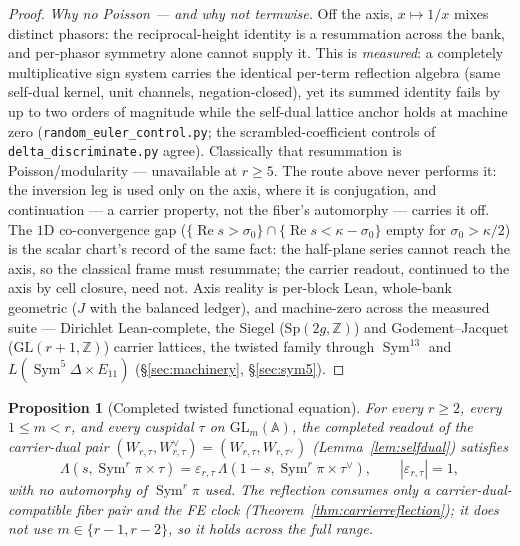 \documentclass[11pt]{article}
\newtheorem{proposition}[theorem]{Proposition}
\theoremstyle{definition}
\renewcommand{\Re}{\operatorname{Re}}
\newcommand{\Sym}{\operatorname{Sym}}
\begin{document}
\begin{proof}
\emph{Why no Poisson --- and why not termwise.} Off the axis, $x\mapsto1/x$ mixes distinct phasors: the
reciprocal-height identity is a resummation across the bank, and per-phasor symmetry alone cannot supply it.
This is \emph{measured}: a completely multiplicative sign system carries the identical per-term reflection
algebra (same self-dual kernel, unit channels, negation-closed), yet its summed identity fails by up to two
orders of magnitude while the self-dual lattice anchor holds at machine zero
(\texttt{random\_euler\_control.py}; the scrambled-coefficient controls of \texttt{delta\_discriminate.py}
agree). Classically that resummation is Poisson/modularity --- unavailable at $r\ge5$. The route above never
performs it: the inversion leg is used only on the axis, where it is conjugation, and continuation --- a
carrier property, not the fiber's automorphy --- carries it off. The $1$D co-convergence gap
($\{\Re s>\sigma_0\}\cap\{\Re s<\kappa-\sigma_0\}$ empty for $\sigma_0>\kappa/2$) is the scalar chart's record
of the same fact: the half-plane series cannot reach the axis, so the classical frame must resummate; the
carrier readout, continued to the axis by cell closure, need not. Axis reality is per-block Lean, whole-bank
geometric ($J$ with the balanced ledger), and machine-zero across the measured suite --- Dirichlet
Lean-complete, the Siegel ($\mathrm{Sp}(2g,\mathbb Z)$) and Godement--Jacquet
($\mathrm{GL}(r{+}1,\mathbb Z)$) carrier lattices, the twisted family through $\Sym^{13}$ and
$L(\Sym^5\Delta\times E_{11})$ (\S\ref{sec:machinery}, \S\ref{sec:sym5}).
\end{proof}

\begin{proposition}[Completed twisted functional equation]\label{prop:completedFE}
For every $r\ge2$, every $1\le m<r$, and every cuspidal $\tau$ on $\mathrm{GL}_m(\mathbb A)$, the completed
readout of the carrier-dual pair $(W_{r,\tau},W_{r,\tau}^\vee)=(W_{r,\tau},W_{r,\tau^\vee})$
(Lemma~\ref{lem:selfdual}) satisfies
\[
  \Lambda(s,\Sym^r\pi\times\tau)=\varepsilon_{r,\tau}\,\Lambda(1-s,\Sym^r\pi\times\tau^\vee),
  \qquad |\varepsilon_{r,\tau}|=1,
\]
with no automorphy of $\Sym^r\pi$ used. The reflection consumes only a carrier-dual-compatible fiber pair and
the FE clock (Theorem~\ref{thm:carrierreflection}); it does not use $m\in\{r-1,r-2\}$, so it holds across the
full range.
\end{proposition}
\end{document}
